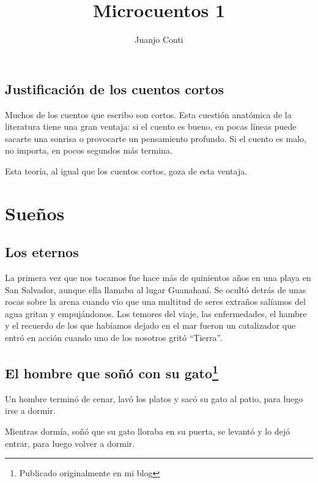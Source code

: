 \documentclass[11pt,twoside,openright,a6paper]{book}
\title{Microcuentos 1}
\author{Juanjo Conti}
\date{}
\begin{document}
\pagestyle{plain}

\maketitle

\tableofcontents

\chapter*{Justificación de los cuentos cortos}

Muchos de los cuentos que escribo son cortos. Esta cuestión anatómica de la literatura tiene una gran ventaja: si el cuento es bueno, en pocas líneas puede sacarte una sonrisa o provocarte un pensamiento profundo. Si el cuento es malo, no importa, en pocos segundos más termina.

Esta teoría, al igual que los cuentos cortos, goza de esta ventaja.


\part*{Sueños}

\chapter*{Los eternos}

La primera vez que nos tocamos fue hace más de quinientos años en una playa en San Salvador, aunque ella llamaba al lugar Guanahaní. Se ocultó detrás de unas rocas sobre la arena cuando vio que una multitud de seres extraños salíamos del agua gritan y empujándonos. Los temores del viaje, las enfermedades, el hambre y el recuerdo de los que habíamos dejado en el mar fueron un catalizador que entró en acción cuando uno de los nosotros gritó “Tierra”.

\chapter*{El hombre que soñó con su gato\footnote{Publicado originalmente en mi blog}}

Un hombre terminó de cenar, lavó los platos y sacó su gato al patio, para luego irse a dormir.

Mientras dormía, soñó que su gato lloraba en su puerta, se levantó y lo dejó entrar, para luego volver a dormir.
\end{document}
